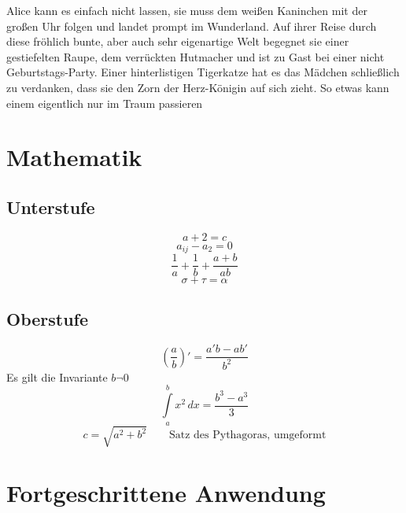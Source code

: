 Alice kann es einfach nicht lassen, sie muss dem weißen Kaninchen mit der großen Uhr folgen und landet prompt im Wunderland. Auf ihrer Reise durch diese fröhlich bunte, aber auch sehr eigenartige Welt begegnet sie einer gestiefelten Raupe, dem verrückten Hutmacher und ist zu Gast bei einer nicht Geburtstags-Party. Einer hinterlistigen Tigerkatze hat es das Mädchen schließlich zu verdanken, dass sie den Zorn der Herz-Königin auf sich zieht. So etwas kann einem eigentlich nur im Traum passieren
\section{Mathematik}
\label{sec:mathematik}

\subsection{Unterstufe}
\label{sec:unterstufe}
\begin{equation*}
	a + 2 = c
\end{equation*}
\begin{equation*}
	a_{ij} - a_2 = 0
\end{equation*}
\begin{equation*}
	\frac{1}{a} + \frac{1}{b} + \frac{a+b}{ab}
\end{equation*}
\begin{equation*}
	\sigma + \tau =\alpha
\end{equation*}

\subsection{Oberstufe}
\label{sec:oberstufe}
\begin{equation}
\label{eq:1}
\left(\frac{a}{b} \right)' =\frac{a'b-ab'}{b^{2}}
\end{equation}
Es gilt die Invariante $b \neg 0$
\begin{equation}
	\label{eq:2}
	\int\limits_{a}^{b} x^{2} \, dx = \frac{ b^{3} - a^{3} }{3}
\end{equation}
\begin{equation}
  \label{eq:3}
  c = \sqrt{ a^{2} + b^{2} } \qquad \text{Satz des Pythagoras, umgeformt}
\end{equation}

\section{Fortgeschrittene Anwendung}
\label{sec:fortg-anwend}

